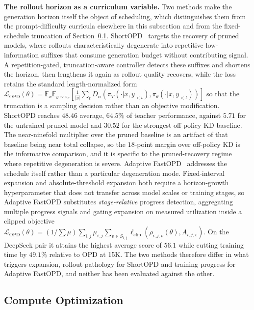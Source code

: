 \documentclass{article} %
\newcommand{\E}{\mathbb{E}}
\begin{document}
\textbf{The rollout horizon as a curriculum variable.} Two methods make the generation horizon itself the object of scheduling, which distinguishes them from the prompt-difficulty curricula elsewhere in this subsection and from the fixed-schedule truncation of Section~\ref{subsec:compute}. ShortOPD~\citep{2607.13124} targets the recovery of pruned models, where rollouts characteristically degenerate into repetitive low-information suffixes that consume generation budget without contributing signal. A repetition-gated, truncation-aware controller detects these suffixes and shortens the horizon, then lengthens it again as rollout quality recovers, while the loss retains the standard length-normalized form $\mathcal{L}_{\text{OPD}}(\theta) = \E_x \E_{y \sim \pi_\theta} [\frac{1}{|y|}\sum_t D_\alpha(\pi_T(\cdot|x,y_{<t}), \pi_\theta(\cdot|x,y_{<t}))]$ so that the truncation is a sampling decision rather than an objective modification. ShortOPD reaches $48.46$ average, $64.5\%$ of teacher performance, against $5.71$ for the untrained pruned model and $30.52$ for the strongest off-policy KD baseline. The near-ninefold multiplier over the pruned baseline is an artifact of that baseline being near total collapse, so the $18$-point margin over off-policy KD is the informative comparison, and it is specific to the pruned-recovery regime where repetitive degeneration is severe. Adaptive FastOPD~\citep{2607.29494} addresses the schedule itself rather than a particular degeneration mode. Fixed-interval expansion and absolute-threshold expansion both require a horizon-growth hyperparameter that does not transfer across model scales or training stages, so Adaptive FastOPD substitutes \emph{stage-relative} progress detection, aggregating multiple progress signals and gating expansion on measured utilization inside a clipped objective $\mathcal{L}_{\text{OPD}}(\theta) = (1/\sum\mu)\sum_{i,j}\mu_{i,j}\sum_{v \in S_{i,j}} \ell_{\text{clip}}(\rho_{i,j,v}(\theta), A_{i,j,v})$. On the DeepSeek pair it attains the highest average score of $56.1$ while cutting training time by $49.1\%$ relative to OPD at 15K. The two methods therefore differ in what triggers expansion, rollout pathology for ShortOPD and training progress for Adaptive FastOPD, and neither has been evaluated against the other.

\subsection{Compute Optimization}
\label{subsec:compute}
\end{document}
